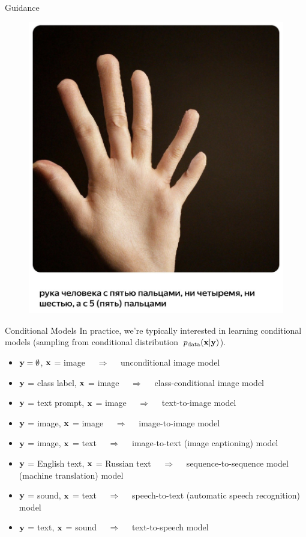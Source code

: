 \documentclass{beamer}
\begin{document}
\begin{frame}{Guidance}
\begin{minipage}[t]{0.5\columnwidth}
\begin{figure}
			\includegraphics[width=0.9\linewidth]{figs/shedevrum2}
		\end{figure}
	\end{minipage}
\end{frame}
\begin{frame}{Conditional Models}
	In practice, we're typically interested in learning conditional models (sampling from conditional distribution~$p_{\text{data}}(\mathbf{x} | \mathbf{y})$). 
	\begin{itemize}
		\item $\mathbf{y} = \emptyset$, $\mathbf{x}$ = image $\quad\Rightarrow\quad$ unconditional image model
		\item $\mathbf{y}$ = class label, $\mathbf{x}$ = image $\quad\Rightarrow\quad$ class-conditional image model
		\item $\mathbf{y}$ = text prompt, $\mathbf{x}$ = image $\quad\Rightarrow\quad$ text-to-image model
		\item $\mathbf{y}$ = image, $\mathbf{x}$ = image $\quad\Rightarrow\quad$ image-to-image model
		\item $\mathbf{y}$ = image, $\mathbf{x}$ = text $\quad\Rightarrow\quad$ image-to-text (image captioning) model
		\item $\mathbf{y}$ = English text, $\mathbf{x}$ = Russian text $\quad\Rightarrow\quad$ sequence-to-sequence model (machine translation) model
		\item $\mathbf{y}$ = sound, $\mathbf{x}$ = text $\quad\Rightarrow\quad$ speech-to-text (automatic speech recognition) model
		\item $\mathbf{y}$ = text, $\mathbf{x}$ = sound $\quad\Rightarrow\quad$ text-to-speech model
	\end{itemize}
\end{frame}
\end{document}
